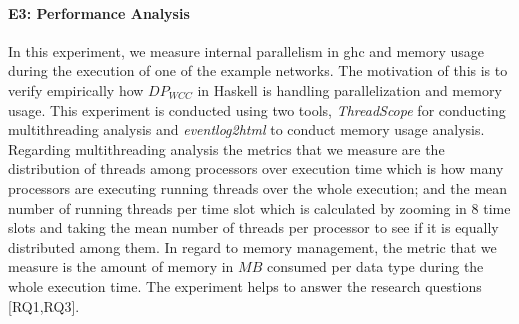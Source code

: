 \paragraph{E3: Performance Analysis}
In this experiment, we measure internal parallelism in \acrshort{ghc} and memory usage during the execution of one of the example networks. The motivation of this is to verify empirically how $DP_{WCC}$ in Haskell is handling parallelization and memory usage. This experiment is conducted using two tools, \textit{ThreadScope} \cite{threadscope} for conducting multithreading analysis and \textit{eventlog2html} \cite{eventlog2html} to conduct memory usage analysis. Regarding multithreading analysis the metrics that we measure are the distribution of threads among processors over execution time which is how many processors are executing running threads over the whole execution; and the mean number of running threads per time slot which is calculated by zooming in $8$ time slots and taking the mean number of threads per processor to see if it is equally distributed among them. In regard to memory management, the metric that we measure is the amount of memory in $MB$ consumed per data type during the whole execution time. The experiment helps to answer the research questions [RQ1,RQ3].

